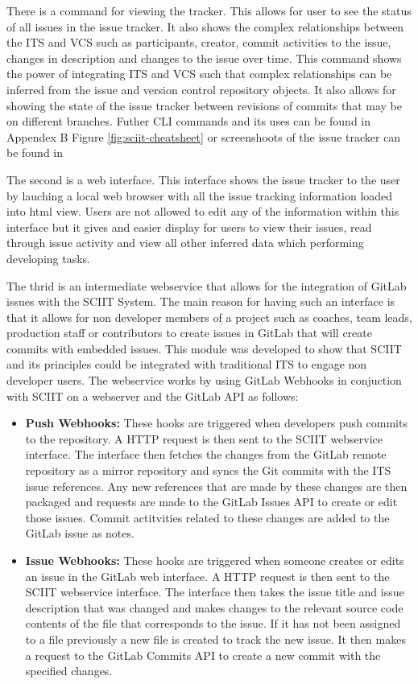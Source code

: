 \documentclass{mproj}
\begin{document}
There is a command for viewing the tracker. This allows for user to see the status of all issues in the issue tracker. It also shows the complex relationships between the ITS and VCS such as participants, creator, commit activities to the issue, changes in description and changes to the issue over time. This command shows the power of integrating ITS and VCS such that complex relationships can be inferred from the issue and version control repository objects. It also allows for showing the state of the issue tracker between revisions of commits that may be on different branches. Futher CLI commands and its uses can be found in Appendex B Figure \ref{fig:sciit-cheatsheet} or screenshoots of the issue tracker can be found in %

The second is a web interface. This interface shows the issue tracker to the user by lauching a local web browser with all the issue tracking information loaded into html view. Users are not allowed to edit any of the information within this interface but it gives and easier display for users to view their issues, read through issue activity and view all other inferred data which performing developing tasks.

The thrid is an intermediate webservice that allows for the integration of GitLab issues with the SCIIT System. The main reason for having such an interface is that it allows for non developer members of a project such as coaches, team leads, production staff or contributors to create issues in GitLab that will create commits with embedded issues. This module was developed to show that SCIIT and its principles could be integrated with traditional ITS to engage non developer users. The webservice works by using GitLab Webhooks in conjuction with SCIIT on a webserver and the GitLab API as follows:

\begin{itemize}
  \item \textbf{Push Webhooks:} These hooks are triggered when developers push commits to the repository. A HTTP request is then sent to the SCIIT webservice interface. The interface then fetches the changes from the GitLab remote repository as a mirror repository and syncs the Git commits with the ITS issue references. Any new references that are made by these changes are then packaged and requests are made to the GitLab Issues API to create or edit those issues. Commit actitvities related to these changes are added to the GitLab issue as notes.
  \item \textbf{Issue Webhooks:} These hooks are triggered when someone creates or edits an issue in the GitLab web interface. A HTTP request is then sent to the SCIIT webservice interface. The interface then takes the issue title and issue description that was changed and makes changes to the relevant source code contents of the file that corresponds to the issue. If it has not been assigned to a file previously a new file is created to track the new issue. It then makes a request to the GitLab Commits API to create a new commit with the specified changes.
\end{itemize}
\end{document}
